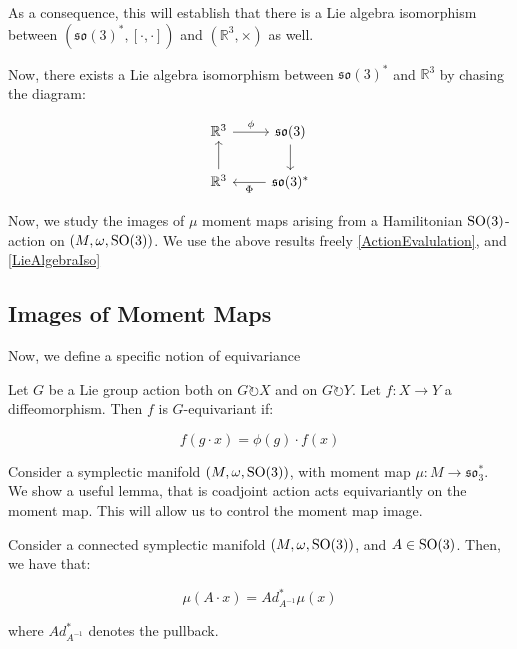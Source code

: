 \begin{remark}
As a consequence, this will establish that there is a Lie algebra isomorphism between $(\mathfrak{so}(3)^{*}, [\cdot, \cdot])$ and $(\mathbb{R}^{3}, \times)$ as well. 
\end{remark}

\begin{remark}
Now, there exists a Lie algebra isomorphism between $\mathfrak{so}(3)^{*}$ and $\mathbb{R}^{3}$ by chasing the diagram: 
\end{remark}

\[
\begin{tikzcd}
\mathbb{R}^3 \arrow[r, "\phi"] & \mathfrak{so}(3) \arrow[d] \\
\mathbb{R}^3 \arrow[u] & \mathfrak{so}(3)^* \arrow[l, "\Phi"]
\end{tikzcd}
\]

\begin{remark}
Now, we study the images of $\mu$ moment maps arising from a Hamilitonian $\rm{SO}(3)$-action on $(M, \omega, \rm{SO}(3))$. We use the above results freely \ref{ActionEvalulation}, and \ref{LieAlgebraIso}
\end{remark}

\subsection{Images of Moment Maps}

Now, we define a specific notion of equivariance

\begin{defn}[$G$-Equivariance]
Let $G$ be a Lie group action both on $G \circlearrowright X$ and on $G \circlearrowright Y$. Let $f: X \to Y$ a diffeomorphism. Then $f$ is $G$-equivariant if:

$$f(g \cdot x) = \phi(g) \cdot f(x)$$
\end{defn}

\noindent Consider a symplectic manifold $(M, \omega, \rm{SO}(3))$, with moment map $\mu: M \to \mathfrak{so}_{3}^{*}$. We  show a useful lemma, that is coadjoint action acts equivariantly on the moment map. This will allow us to control the moment map image. 

\begin{lemma}
Consider a connected symplectic manifold $(M, \omega, \rm{SO}(3))$, and $A \in \rm{SO}(3)$. Then, we have that:

$$\mu(A \cdot x) =  Ad_{A^{-1}}^{*} \mu(x)$$

\noindent where $Ad_{A^{-1}}^{*}$ denotes the pullback. 
\end{lemma}

